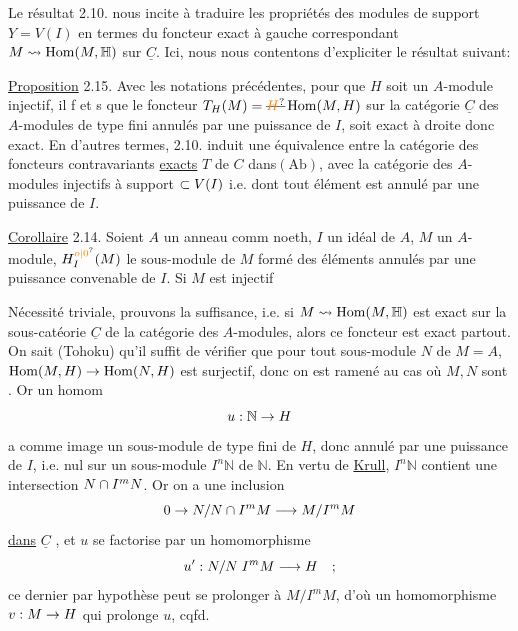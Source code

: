 Le résultat 2.10. nous incite à traduire les propriétés des
modules  de support $Y=V(I)$ en termes du foncteur exact à gauche
correspondant $M\leadsto\operatorname{Hom}(M,\mathbb H)$ sur $\underline C$. Ici, nous nous contentons d'expliciter
le résultat suivant:

\uline{Proposition} 2.15. Avec les notations précédentes, pour que $H$ soit un
$A$-module injectif, il f et s que le foncteur $T_H(M)=\deleted{\unsure{H}}\operatorname{Hom}(M,H)$ sur la
catégorie $\underline C$ des $A$-modules de type fini  annulés par une puissance
de $I$, soit exact à droite donc exact. En d'autres termes, 2.10. induit
une équivalence entre la catégorie des foncteurs contravariants \uline{exacts}
$T$ de $C$ dans$(\mathrm{Ab})$, avec la catégorie des $A$-modules injectifs à support $\subset V(I)$
i.e. dont tout élément est annulé par une puissance de $I$.

\uline{Corollaire} 2.14. Soient $A$ un anneau comm noeth, $I$ un idéal de $A$, $M$ un
$A$-module, $H_I^{\unsure{o|0}}(M)$ le sous-module de $M$ formé des éléments annulés par une
puissance convenable de $I$. Si $M$ est injectif

Nécessité triviale, prouvons la suffisance, i.e. si $M\leadsto\operatorname{Hom}(M,\mathbb H)$ est
exact sur la sous-catéorie $\underline C$ de la catégorie des $A$-modules, alors ce
foncteur est exact partout. On sait (Tohoku) qu'il suffit de  vérifier
que pour tout sous-module $N$ de $M=A$, $\operatorname{Hom}(M,H)\to\operatorname{Hom}(N,H)$ est surjectif,
donc on est ramené au cas où $M,N$ sont . Or un homom
\[
u:\mathbb N\to H
\]
a comme image un sous-module de type fini de $H$, donc annulé par une
puissance de $I$, i.e.  nul sur un sous-module $I^n\mathbb N$ de $\mathbb N$. En vertu de \uline{Krull},
$I^n\mathbb N$ contient une intersection $N\cap I^mN$. Or on a une inclusion
\[
0\to N/N\cap I^mM\longrightarrow M/I^mM
\]
\uline{dans} $\underline C$ , et $u$ se factorise par un homomorphisme
\[
u':N/N\; I^mM\longrightarrow H\quad;
\]
ce dernier par hypothèse peut se prolonger à $M/I^mM$, d'où un homomorphisme
$v:M\to H$ qui prolonge $u$, cqfd.

